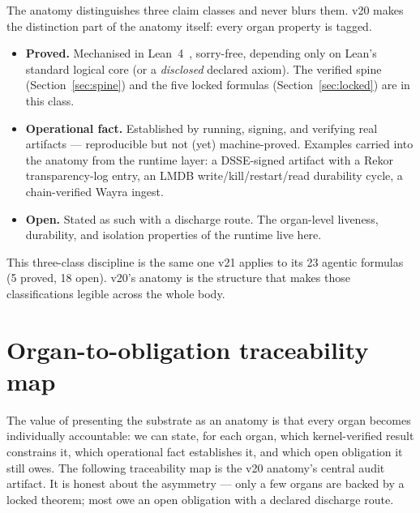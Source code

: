 \documentclass[11pt]{article}
\theoremstyle{plain}
\theoremstyle{definition}
\theoremstyle{remark}
\begin{document}
The anatomy distinguishes three claim classes and never blurs them. v20 makes the
distinction part of the anatomy itself: every organ property is tagged.

\begin{itemize}[leftmargin=1.4em]
\item \textbf{Proved.} Mechanised in Lean~4~\cite{lean4}, sorry-free, depending only on
Lean's standard logical core (or a \emph{disclosed} declared axiom). The verified spine
(Section~\ref{sec:spine}) and the five locked formulas (Section~\ref{sec:locked}) are in
this class.
\item \textbf{Operational fact.} Established by running, signing, and verifying real
artifacts --- reproducible but not (yet) machine-proved. Examples carried into the
anatomy from the runtime layer: a DSSE-signed artifact with a Rekor transparency-log
entry, an LMDB write/kill/restart/read durability cycle, a chain-verified Wayra ingest.
\item \textbf{Open.} Stated as such with a discharge route. The organ-level liveness,
durability, and isolation properties of the runtime live here.
\end{itemize}

This three-class discipline is the same one v21 applies to its 23 agentic formulas
(5 proved, 18 open). v20's anatomy is the structure that makes those classifications
legible across the whole body.

\section{Organ-to-obligation traceability map}
\label{sec:trace}

The value of presenting the substrate as an anatomy is that every organ becomes
individually accountable: we can state, for each organ, which kernel-verified result
constrains it, which operational fact establishes it, and which open obligation it still
owes. The following traceability map is the v20 anatomy's central audit artifact. It is
honest about the asymmetry --- only a few organs are backed by a locked theorem; most owe
an open obligation with a declared discharge route.
\end{document}
